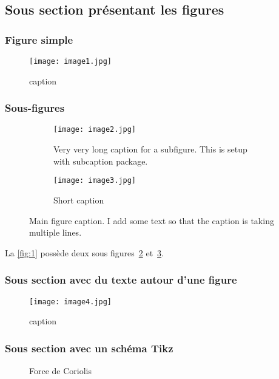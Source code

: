 \subsection{Sous section présentant les figures}

\subsubsection{Figure simple}

\blindtext[3]
\begin{figure}[htbp]
    \centering
    \texttt{[image: image1.jpg]}
    \caption{caption}%
    \label{fig:label}
\end{figure}

\subsubsection{Sous-figures}

\blindtext[4]
\begin{figure}[htbp]
    \centering
    \begin{subfigure}[t]{0.49\textwidth}
        \centering
        \texttt{[image: image2.jpg]}
        \caption{Very very long caption for a subfigure. This is setup with subcaption package.}%
        \label{fig:1a}
    \end{subfigure}
    \hfill
    \begin{subfigure}[t]{0.49\textwidth}
        \centering
        \texttt{[image: image3.jpg]}
        \caption{Short caption}%
        \label{fig:1b}
    \end{subfigure}
    \caption{Main figure caption. I add some text so that the caption is taking multiple lines.}%
    \label{fig:1}
\end{figure}

La \autoref{fig:1} possède deux sous figures~\ref{fig:1a} et~\ref{fig:1b}.

\subsubsection{Sous section avec du texte autour d'une figure}

\blindtext[1]

\begin{wrapfigure}{r}{0.5\textwidth} %
    \centering
    \texttt{[image: image4.jpg]}%
    \caption{caption}%
    \label{fig:wrapfig}
\end{wrapfigure}

\blindtext[2]

\subsubsection{Sous section avec un schéma Tikz}

\blindtext[5]
\begin{figure}[ht]
    \centering
    
    \caption{Force de Coriolis}%
    \label{fig:coriolis}
\end{figure}

